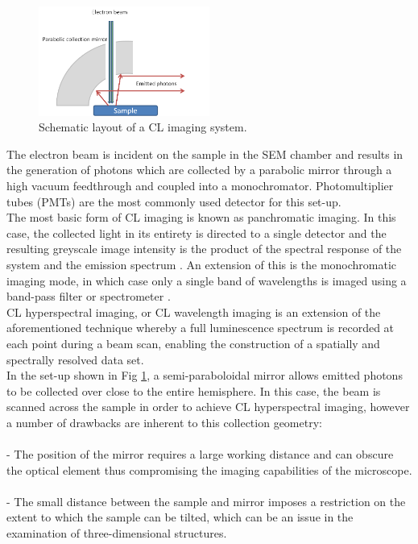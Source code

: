 \begin{figure}[!ht]
	\centering
	\includegraphics[width=0.5\textwidth]{Figs/Ch2/CL.png}
	\caption[h] {Schematic layout of a CL imaging system.}
	\label{2.6}
\end{figure}
\FloatBarrier

The electron beam is incident on the sample in the SEM chamber and results in the generation of photons which are collected by a parabolic mirror through a high vacuum feedthrough and coupled into a monochromator. Photomultiplier tubes (PMTs) are the most commonly used detector for this set-up. \\
The most basic form of CL imaging is known as panchromatic imaging. In this case, the collected light in its entirety is directed to a single detector and the resulting greyscale image intensity is the product of the spectral response of the system and the emission spectrum \cite{Edwards2011}. An extension of this is the monochromatic imaging mode, in which case only a single band of wavelengths is imaged using a band-pass filter or spectrometer \cite{Edwards2011}.\\
CL hyperspectral imaging, or CL wavelength imaging is an extension of the aforementioned technique whereby a full luminescence spectrum is recorded at each point during a beam scan, enabling the construction of a spatially and spectrally resolved data set.\\
 In the set-up shown in Fig \ref{2.6}, a semi-paraboloidal mirror allows emitted photons to be collected over close to the entire hemisphere. In this case, the beam is scanned across the sample in order to achieve CL hyperspectral imaging, however a number of drawbacks are inherent to this collection geometry:\\
\\\indent - The position of the mirror requires a large working distance and can obscure the optical element thus compromising the imaging capabilities of the microscope.\\
\\\indent - The small distance between the sample and mirror imposes a restriction on the extent to which the sample can be tilted, which can be an issue in the examination of three-dimensional structures.\\
